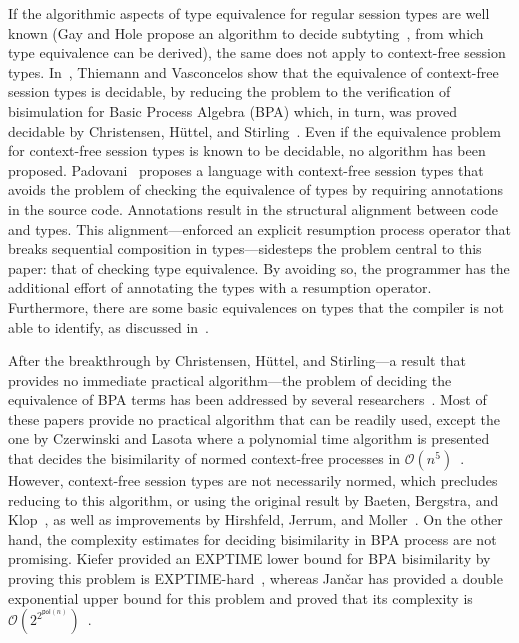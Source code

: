 If the algorithmic aspects of type equivalence for regular session
types are well known (Gay and Hole propose an algorithm to decide
subtyting~\cite{DBLP:journals/acta/GayH05}, from which type
equivalence can be derived), the same does not apply to context-free
session types.
%
In~\cite{thiemann2016context}, Thiemann and Vasconcelos show that the
equivalence of context-free session types is decidable, by reducing
the problem to the verification of bisimulation for Basic Process
Algebra (BPA) which, in turn, was proved decidable by Christensen,
H{\"{u}}ttel, and Stirling~\cite{DBLP:journals/iandc/ChristensenHS95}.
%
Even if the equivalence problem for context-free session types is
known to be decidable, no algorithm has been proposed.
%
Padovani~\cite{DBLP:conf/esop/Padovani17} proposes a language with
context-free session types that avoids the problem of checking the
equivalence of types by requiring annotations in the source
code. Annotations result in the structural alignment between code and
types. This alignment---enforced an explicit resumption process
operator that breaks sequential composition in types---sidesteps the
problem central to this paper: that of checking type equivalence.
By avoiding so, the programmer has the additional effort of 
annotating the types with a resumption operator. Furthermore, there
are some basic equivalences on types that the compiler is not 
able to identify, as discussed in~\cite{DBLP:conf/esop/Padovani17}.

After the breakthrough by Christensen, H\"uttel, and Stirling---a
result that provides no immediate practical algorithm---the problem of
deciding the equivalence of BPA terms has been addressed by several
researchers~\cite{DBLP:conf/mfcs/BurkartCS95,DBLP:journals/iandc/ChristensenHS95,czerwinski2010fast,janvcar1999techniques}.
Most of these papers provide no practical algorithm that can be
readily used, except the one by Czerwinski and Lasota where a
polynomial time algorithm is presented that decides the bisimilarity
of normed context-free processes in
$\mathcal{O}(n^5)$~\cite{czerwinski2010fast}.
%
However, context-free session types are not necessarily normed, which
precludes reducing to this algorithm, or using the original result by
Baeten, Bergstra, and Klop~\cite{baeten1993decidability}, as well as
improvements by Hirshfeld, Jerrum, and
Moller~\cite{DBLP:journals/tcs/HirshfeldJM96,DBLP:conf/concur/HirshfeldM94}.
On the other hand, the complexity estimates for deciding bisimilarity
in BPA process are not promising. Kiefer provided an EXPTIME lower
bound for BPA bisimilarity by proving this problem is
EXPTIME-hard~\cite{kiefer2013bpa}, whereas Jan\v car has provided a
double exponential upper bound for this problem and proved that its
complexity is
$\mathcal{O}(2^{2^{\mathsf{pol}(n)}})$~\cite{jancar2012bisimilarity}.

